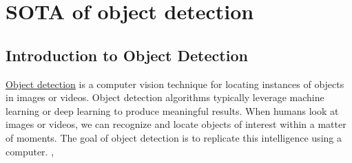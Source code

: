 \section{SOTA of object detection}
\subsection{Introduction to Object Detection}
\href{https://www.mathworks.com/discovery/object-detection.html#:~:text=Object%20detection%20is%20a%20computer,learning%20to%20produce%20meaningful%20results.}{Object detection} is a computer vision technique for locating instances of objects in images or videos. Object detection algorithms typically leverage machine learning or deep learning to produce meaningful results. When humans look at images or videos, we can recognize and locate objects of interest within a matter of moments. The goal of object detection is to replicate this intelligence using a computer. \cite{zhao2019object}, \cite{ansari2020building}
